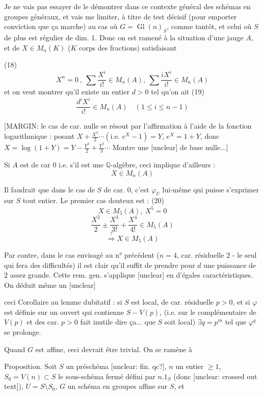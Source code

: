 Je ne vais pas essayer de le démontrer dans ce
contexte général des schémas en groupes généraux,
et vais me limiter, à titre de test décisif
(pour emporter conviction que ça marche)
au cas où $G = \operatorname{Gl}(n)_S$, comme tantôt,
et celui où $S$ de plus est régulier de dim. 1.
Donc on est ramené à la situation d'une jauge
$A$, et de $X \in M_n(K)$ ($K$ corps des fractions)
satisfaisant

\newpage


(18) $$ X^n=0 \ , \ \sum \frac{X^i}{i!} \in M_n(A), \ \sum \frac{i X^i}{i!} \in M_n(A) $$
et on veut montrer qu'il existe un entier $d>0$
tel qu'on ait
(19) $$ \frac{d^i X^i}{i!} \in M_n(A) \quad (1 \leq i \leq n-1) $$

[MARGIN: le cas de car. nulle se résout par l'affirmation à l'aide de la fonction logarithmique :
posant $X+\frac{X^2}{2} \cdots (\text{i.e. } e^X-1) = Y$,
$e^X = 1+Y$, donc
$X = \log(1+Y) = Y - \frac{Y^2}{2} + \frac{Y^3}{3} \cdots$
Montre une [unclear] de base nulle...]

Si $A$ est de car $0$ i.e. s'il est une $\mathbb{Q}$-algèbre, ceci implique d'ailleurs :
$$ X \in M_n(A) $$

Il faudrait que dans le cas de $S$ de car. $0$, c'est $\varphi_U$ lui-même qui puisse s'exprimer sur $S$ tout entier. Le premier cas douteux est :
(20) $$ X \in M_5(A), \ X^5 = 0 $$
$$ \frac{X^2}{2} \pm \frac{X^3}{3!} + \frac{X^4}{4!} \in M_5(A) $$
$$ \stackrel{?}{\Rightarrow} X \in M_5(A) $$

Par contre, dans le cas envisagé au n° précédent ($n=4$, car. résiduelle $2$ - le seul qui fera des difficultés) il est clair qu'il suffit de prendre pour $d$ une puissance de $2$ assez grande.
Cette rem. gen. s'applique [unclear] en d'égales caractéristiques. On déduit même un [unclear]

ceci
Corollaire au lemme dubitatif : si $S$ est local, de car. résiduelle $p>0$, et si $\varphi$ est définie sur un ouvert qui contienne $S - V(p)$, (i.e. sur le complémentaire de $V(p)$ et des car. $p>0$ fait inutile dire ça... que $S$ soit local) $\exists q = p^m$ tel que $\varphi^q$ se prolonge.

\newpage


Quand $G$ est affine, ceci devrait être trivial. On se ramène à

Proposition. Soit $S$ un préschéma [unclear: fin. qc?], $n$ un entier $\ge 1$, $S_0 = V(n) \subset S$ le sous-schéma fermé défini par $n.1_S$ (donc [unclear: crossed out text]), $U = S \setminus S_0$, $G$ un schéma en groupes affine sur $S$, et

